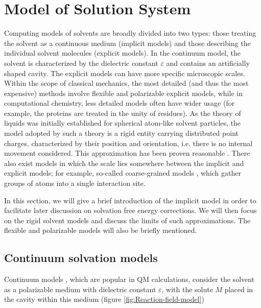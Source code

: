 
\chapter{Model of Solution System\label{chpt:models}}

Computing models of solvents are broadly divided into two types: those
treating the solvent as a continuous medium (implicit models) and
those describing the individual solvent molecules (explicit models).
In the continuum model, the solvent is characterized by the dielectric
constant $\varepsilon$ and contains an artificially shaped cavity.
The explicit models can have more specific microscopic scales. Within
the scope of classical mechanics, the most detailed (and thus the
most expensive) methods involve flexible and polarizable explicit
models, while in computational chemistry, less detailed models often
have wider usage (for example, the proteins are treated in the unity
of residues). As the theory of liquids was initially established for
spherical atom-like solvent particles, the model adopted by such a
theory is a rigid entity carrying distributed point charges, characterized
by their position and orientation, i.e. there is no internal movement
considered. This approximation has been proven reasonable \citep{Gray-Gubbins}.
There also exist models in which the scale lies somewhere between
the implicit and explicit models; for example, so-called coarse-grained
models \citep{hadley_coarse-grained_2012}, which gather groups of
atoms into a single interaction site.

In this section, we will give a brief introduction of the implicit
model in order to facilitate later discussion on solvation free energy
corrections. We will then focus on the rigid solvent models and discuss
the limits of such approximations. The flexible and polarizable models
will also be briefly mentioned. 

\section{Continuum solvation models}

Continuum models \citep{Jensen,Cramer_1999,Tomasi_1994_implicit_model},
which are popular in \acs{QM} calculations, consider the solvent
as a polarizable medium with dielectric constant $\varepsilon$, with the solute $M$ placed in the cavity within this medium (figure
\ref{fig:Reaction-field-model}) 

